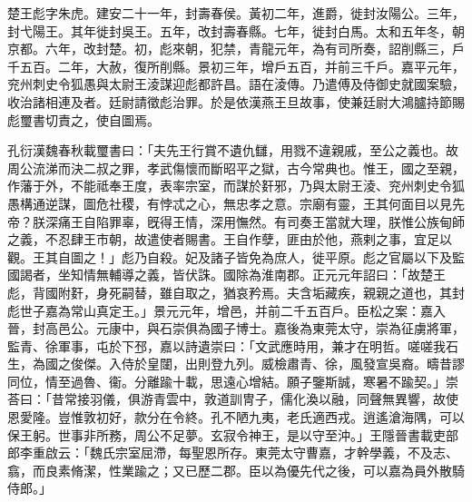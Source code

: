 
\begin{pinyinscope}
楚王彪字朱虎。建安二十一年，封壽春侯。黃初二年，進爵，徙封汝陽公。三年，封弋陽王。其年徙封吳王。五年，改封壽春縣。七年，徙封白馬。太和五年冬，朝京都。六年，改封楚。初，彪來朝，犯禁，青龍元年，為有司所奏，詔削縣三，戶千五百。二年，大赦，復所削縣。景初三年，增戶五百，并前三千戶。嘉平元年，兖州刺史令狐愚與太尉王淩謀迎彪都許昌。語在淩傳。乃遣傅及侍御史就國案驗，收治諸相連及者。廷尉請徵彪治罪。於是依漢燕王旦故事，使兼廷尉大鴻臚持節賜彪璽書切責之，使自圖焉。

孔衍漢魏春秋載璽書曰：「夫先王行賞不遺仇讎，用戮不違親戚，至公之義也。故周公流涕而決二叔之罪，孝武傷懷而斷昭平之獄，古今常典也。惟王，國之至親，作藩于外，不能祗奉王度，表率宗室，而謀於姧邪，乃與太尉王淩、兖州刺史令狐愚構通逆謀，圖危社稷，有悖忒之心，無忠孝之意。宗廟有靈，王其何面目以見先帝？朕深痛王自陷罪辜，旣得王情，深用憮然。有司奏王當就大理，朕惟公族甸師之義，不忍肆王市朝，故遣使者賜書。王自作孽，匪由於他，燕剌之事，宜足以觀。王其自圖之！」彪乃自殺。妃及諸子皆免為庶人，徙平原。彪之官屬以下及監國謁者，坐知情無輔導之義，皆伏誅。國除為淮南郡。正元元年詔曰：「故楚王彪，背國附姧，身死嗣替，雖自取之，猶哀矜焉。夫含垢藏疾，親親之道也，其封彪世子嘉為常山真定王。」景元元年，增邑，并前二千五百戶。臣松之案：嘉入晉，封高邑公。元康中，與石崇俱為國子博士。嘉後為東莞太守，崇為征虜將軍，監青、徐軍事，屯於下邳，嘉以詩遺崇曰：「文武應時用，兼才在明哲。嗟嗟我石生，為國之俊傑。入侍於皇闥，出則登九列。威檢肅青、徐，風發宣吳裔。疇昔謬同位，情至過魯、衞。分離踰十載，思遠心增結。願子鑒斯誠，寒暑不踰契。」崇荅曰：「昔常接羽儀，俱游青雲中，敦道訓冑子，儒化渙以融，同聲無異響，故使恩愛隆。豈惟敦初好，款分在令終。孔不陋九夷，老氏適西戎。逍遙滄海隅，可以保王躬。世事非所務，周公不足夢。玄寂令神王，是以守至沖。」王隱晉書載吏部郎李重啟云：「魏氏宗室屈滯，每聖恩所存。東莞太守曹嘉，才幹學義，不及志、翕，而良素脩潔，性業踰之；又已歷二郡。臣以為優先代之後，可以嘉為員外散騎侍郎。」


\end{pinyinscope}